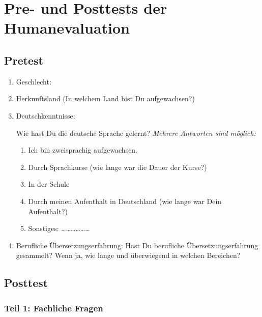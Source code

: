 \chapter{Pre- und Posttests der Humanevaluation}\label{app:2}

\section*{Pretest}

\begin{enumerate}
\item Geschlecht:
\item Herkunftsland (In welchem Land bist Du aufgewachsen?)
\item Deutschkenntnisse:

Wie hast Du die deutsche Sprache gelernt? \textit{Mehrere Antworten sind möglich:}


\begin{enumerate}
\item Ich bin zweisprachig aufgewachsen.
\item Durch Sprachkurse (wie lange war die Dauer der Kurse?)
\item In der Schule
\item Durch meinen Aufenthalt in Deutschland (wie lange war Dein Aufenthalt?)
\item Sonstiges: ………………
\end{enumerate}

\item Berufliche Übersetzungserfahrung: Hast Du berufliche Übersetzungserfahrung gesammelt? Wenn ja, wie lange und überwiegend in welchen Bereichen?
\end{enumerate}

\section*{Posttest}

\subsection*{Teil 1: Fachliche Fragen}


